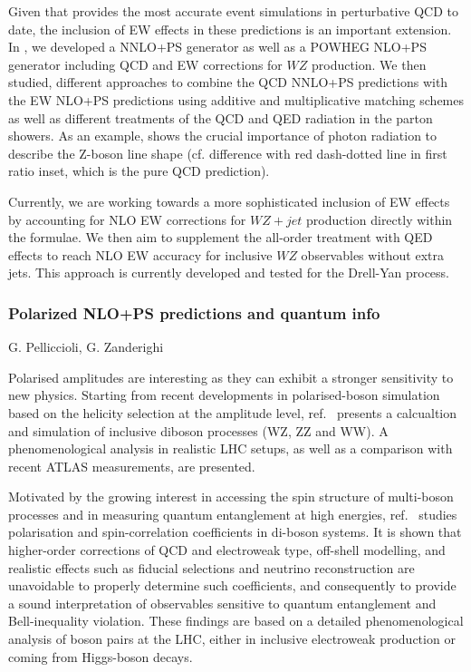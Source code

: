\documentclass{FBR_Bericht_2025}
\begin{document}
\begin{refsection}
Given that \minnlo{} provides the most accurate event simulations in 
perturbative QCD to date, the inclusion of EW effects in these predictions
is an important extension. In , we developed a \minnlo{} NNLO+PS generator 
as well as a POWHEG NLO+PS  generator including QCD and EW corrections 
for $WZ$ production. We then studied, different approaches to combine the
QCD NNLO+PS predictions with the EW NLO+PS predictions using additive 
and multiplicative matching schemes as well as different treatments of the 
QCD and QED radiation in the parton showers.
As an example,  shows the crucial importance of photon radiation
to describe the Z-boson line shape (cf. difference with 
red dash-dotted line in first ratio inset, which is the pure QCD prediction).

Currently, we are working towards a more sophisticated inclusion of EW effects 
by accounting for NLO EW corrections for $WZ+jet$ production
directly within the \minnlo{} formulae. We then aim to supplement the all-order treatment 
with QED effects to reach NLO EW accuracy for inclusive $WZ$ observables without
extra jets. This approach is currently developed and tested for the Drell-Yan process.


\subsubsection{Polarized NLO+PS predictions and quantum info}
\begin{Namen}
G. Pelliccioli, G. Zanderighi
\end{Namen}
%

Polarised amplitudes are interesting as they can exhibit a stronger
sensitivity to new physics.
%
Starting from recent developments in polarised-boson simulation based
on the helicity selection at the amplitude level,
ref.~\cite{Pelliccioli:2023zpd} presents a calcualtion and simulation
of inclusive diboson processes (WZ, ZZ and WW). A phenomenological
analysis in realistic LHC setups, as well as a comparison with recent
ATLAS measurements, are presented.

Motivated by the growing interest in accessing the spin structure of
multi-boson processes and in measuring quantum entanglement at high
energies, ref.~\cite{Grossi:2024jae} studies polarisation and
spin-correlation coefficients in di-boson systems. It is shown that
higher-order corrections of QCD and electroweak type, off-shell
modelling, and realistic effects such as fiducial selections and
neutrino reconstruction are unavoidable to properly determine such
coefficients, and consequently to provide a sound interpretation of
observables sensitive to quantum entanglement and Bell-inequality
violation. These findings are based on a detailed phenomenological
analysis of boson pairs at the LHC, either in inclusive electroweak
production or coming from Higgs-boson decays.

\printbibliography[heading=subbibliography]
\end{refsection}
\end{document}
